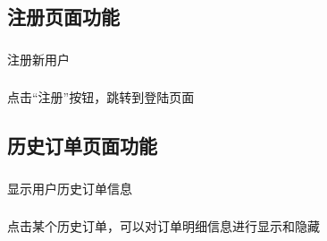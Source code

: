 \subsection{注册页面功能}
\subsubsection*{}
注册新用户
\subsubsection*{}
点击“注册”按钮，跳转到登陆页面~\\

\subsection{历史订单页面功能}
\subsubsection*{}
显示用户历史订单信息
\subsubsection*{}
点击某个历史订单，可以对订单明细信息进行显示和隐藏~\\


